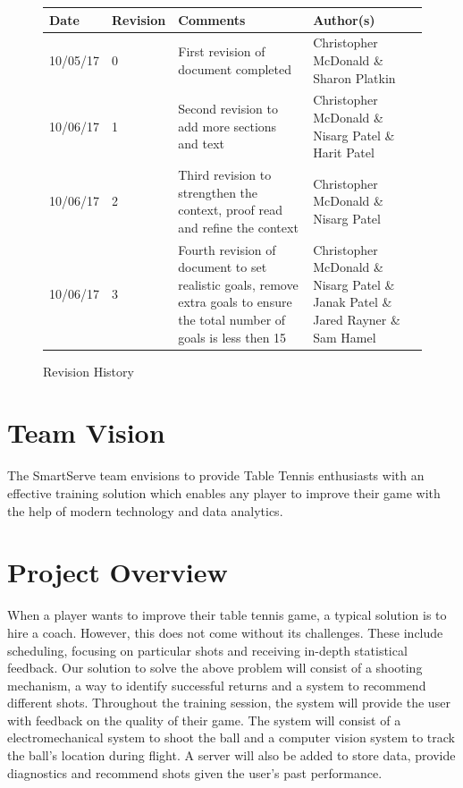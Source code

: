 \documentclass[11pt]{article}
\begin{document}
\tableofcontents
\listoffigures

\vfill
\begin{figure}[htbp]
   \centering
   \noindent\begin{tabularx}{\textwidth}{|X|p{2cm}|X|X|}
   \hline 
   \textbf{Date} & \textbf{Revision} & \textbf{Comments} & \textbf{Author(s)} \\
   \hline 
   10/05/17 & 0 & First revision of document completed & Christopher McDonald \& Sharon Platkin \\ \hline
   10/06/17 & 1 & Second revision to add more sections and text & Christopher McDonald \& Nisarg Patel \& Harit Patel \\ \hline
   10/06/17 & 2 & Third revision to strengthen the context, proof read and refine the context & Christopher McDonald \& Nisarg Patel \\ \hline
   10/06/17 & 3 & Fourth revision of document to set realistic goals, remove extra goals to ensure the total number of goals is less then 15 & Christopher McDonald \& Nisarg Patel \& Janak Patel \& Jared Rayner \& Sam Hamel \\
   \hline
   \end{tabularx}
   \caption{Revision History}
\end{figure}

\newpage
\section{Team Vision}
The SmartServe team envisions to provide Table Tennis enthusiasts with an effective training solution which enables any player to improve their game with the help of modern technology and data analytics.
\section{Project Overview}
When a player wants to improve their table tennis game, a typical solution is to hire a coach. However, this does not come without its challenges. These include scheduling, focusing on particular shots and receiving in-depth statistical feedback. Our solution to solve the above problem will consist of a shooting mechanism, a way to identify successful returns and a system to recommend different shots. Throughout the training session, the system will provide the user with feedback on the quality of their game. The system will consist of a electromechanical system to shoot the ball and a computer vision system to track the ball's location during flight. A server will also be added to store data, provide diagnostics and recommend shots given the user's past performance.
\end{document}
